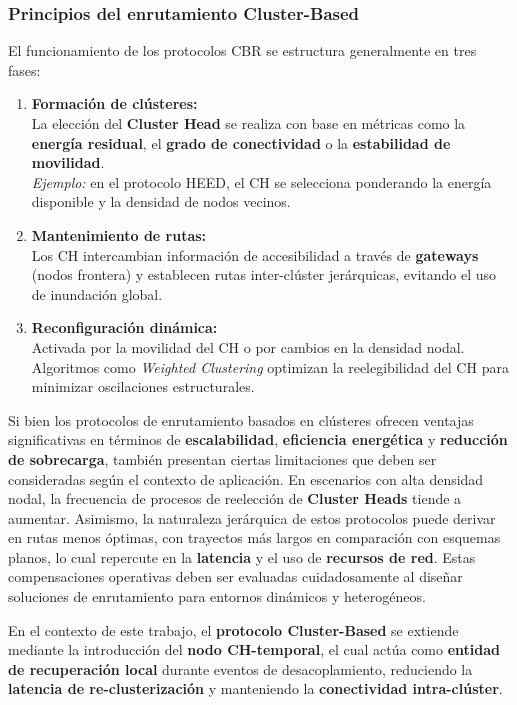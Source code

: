 \documentclass{article}
\begin{document}
\subsubsection{Principios del enrutamiento Cluster-Based}
El funcionamiento de los protocolos CBR se estructura generalmente en tres fases:
\begin{enumerate}
    \item \textbf{Formación de clústeres:} \\
    La elección del \textbf{Cluster Head} se realiza con base en métricas como la \textbf{energía residual}, el \textbf{grado de conectividad} o la \textbf{estabilidad de movilidad}. \\
    \textit{Ejemplo:} en el protocolo HEED, el CH se selecciona ponderando la energía disponible y la densidad de nodos vecinos.

    \item \textbf{Mantenimiento de rutas:} \\
    Los CH intercambian información de accesibilidad a través de \textbf{gateways} (nodos frontera) y establecen rutas inter-clúster jerárquicas, evitando el uso de inundación global.

    \item \textbf{Reconfiguración dinámica:} \\
    Activada por la movilidad del CH o por cambios en la densidad nodal. Algoritmos como \textit{Weighted Clustering} optimizan la reelegibilidad del CH para minimizar oscilaciones estructurales.
\end{enumerate}

Si bien los protocolos de enrutamiento basados en clústeres ofrecen ventajas significativas en términos de \textbf{escalabilidad}, \textbf{eficiencia energética} y \textbf{reducción de sobrecarga}, también presentan ciertas limitaciones que deben ser consideradas según el contexto de aplicación. En escenarios con alta densidad nodal, la frecuencia de procesos de reelección de \textbf{Cluster Heads} tiende a aumentar. Asimismo, la naturaleza jerárquica de estos protocolos puede derivar en rutas menos óptimas, con trayectos más largos en comparación con esquemas planos, lo cual repercute en la \textbf{latencia} y el uso de \textbf{recursos de red}. Estas compensaciones operativas deben ser evaluadas cuidadosamente al diseñar soluciones de enrutamiento para entornos dinámicos y heterogéneos.

En el contexto de este trabajo, el \textbf{protocolo Cluster-Based} se extiende mediante la introducción del \textbf{nodo CH-temporal}, el cual actúa como \textbf{entidad de recuperación local} durante eventos de desacoplamiento, reduciendo la \textbf{latencia de re-clusterización} y manteniendo la \textbf{conectividad intra-clúster}.
\end{document}
